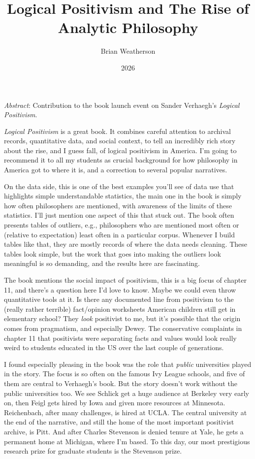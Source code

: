 \documentclass[
  11pt,
  letterpaper,
  DIV=11,
  numbers=noendperiod,
  twoside]{scrartcl}
\title{Logical Positivism and The Rise of Analytic Philosophy}
\author{Brian Weatherson}
\date{2026}
\renewenvironment{abstract}
 {\vspace{-1.25cm}
 \quotation\small\noindent\emph{Abstract}:}
 {\endquotation}
\renewenvironment{abstract}
 {\quotation\small\noindent\emph{Abstract}:}
 {\endquotation\vspace{-0.02cm}}
\begin{document}
\maketitle
\begin{abstract}
Contribution to the book launch event on Sander Verhaegh's \emph{Logical
Positivism}.
\end{abstract}


\emph{Logical Positivism} is a great book. It combines careful attention
to archival records, quantitative data, and social context, to tell an
incredibly rich story about the rise, and I guess fall, of logical
positivism in America. I'm going to recommend it to all my students as
crucial background for how philosophy in America got to where it is, and
a correction to several popular narratives.

On the data side, this is one of the best examples you'll see of data
use that highlights simple understandable statistics, the main one in
the book is simply how often philosophers are mentioned, with awareness
of the limits of these statistics. I'll just mention one aspect of this
that stuck out. The book often presents tables of outliers, e.g.,
philosophers who are mentioned most often or (relative to expectation)
least often in a particular corpus. Whenever I build tables like that,
they are mostly records of where the data needs cleaning. These tables
look simple, but the work that goes into making the outliers look
meaningful is so demanding, and the results here are fascinating.

The book mentions the social impact of positivism, this is a big focus
of chapter 11, and there's a question here I'd love to know. Maybe we
could even throw quantitative tools at it. Is there any documented line
from positivism to the (really rather terrible) fact/opinion worksheets
American children still get in elementary school? They \emph{look}
positivist to me, but it's possible that the origin comes from
pragmatism, and especially Dewey. The conservative complaints in chapter
11 that positivists were separating facts and values would look really
weird to students educated in the US over the last couple of
generations.

I found especially pleasing in the book was the role that \emph{public}
universities played in the story. The focus is so often on the famous
Ivy League schools, and five of them are central to Verhaegh's book. But
the story doesn't work without the public universities too. We see
Schlick get a huge audience at Berkeley very early on, then Feigl gets
hired by Iowa and given more resources at Minnesota. Reichenbach, after
many challenges, is hired at UCLA. The central university at the end of
the narrative, and still the home of the most important positivist
archive, is Pitt. And after Charles Stevenson is denied tenure at Yale,
he gets a permanent home at Michigan, where I'm based. To this day, our
most prestigious research prize for graduate students is the Stevenson
prize.
\end{document}
